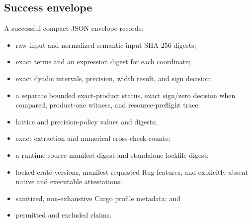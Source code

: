 \documentclass[11pt]{article}
\theoremstyle{definition}
\begin{document}
\subsection{Success envelope}

A successful compact JSON envelope records:
\begin{itemize}[leftmargin=*]
  \item raw-input and normalized semantic-input SHA-256 digests;
  \item exact terms and an expression digest for each coordinate;
  \item exact dyadic intervals, precision, width result, and sign decision;
  \item a separate bounded exact-product status, exact sign/zero decision when compared,
        product-one witness, and resource-preflight trace;
  \item lattice and precision-policy values and digests;
  \item exact extraction and numerical cross-check counts;
  \item a runtime source-manifest digest and standalone lockfile digest;
  \item locked crate versions, manifest-requested Rug features, and explicitly absent native and
  executable attestations;
  \item sanitized, non-exhaustive Cargo profile metadata; and
  \item permitted and excluded claims.
\end{itemize}
\end{document}
